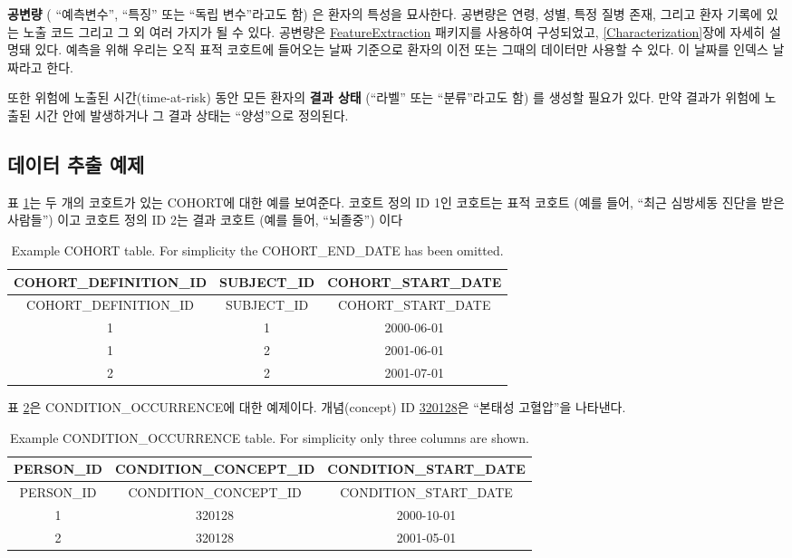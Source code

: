\documentclass[11pt]{book}
\theoremstyle{definition}
\theoremstyle{definition}
\theoremstyle{definition}
\theoremstyle{remark}
\begin{document}
\textbf{공변량} ( ``예측변수'', ``특징'' 또는 ``독립 변수''라고도 함) 은
환자의 특성을 묘사한다. 공변량은 연령, 성별, 특정 질병 존재, 그리고 환자
기록에 있는 노출 코드 그리고 그 외 여러 가지가 될 수 있다. 공변량은
\href{https://ohdsi.github.io/FeatureExtraction/}{FeatureExtraction}
패키지를 사용하여 구성되었고, \ref{Characterization}장에 자세히 설명돼
있다. 예측을 위해 우리는 오직 표적 코호트에 들어오는 날짜 기준으로
환자의 이전 또는 그때의 데이터만 사용할 수 있다. 이 날짜를 인덱스
날짜라고 한다.

또한 위험에 노출된 시간(time-at-risk) 동안 모든 환자의 \textbf{결과
상태} (``라벨'' 또는 ``분류''라고도 함) 를 생성할 필요가 있다. 만약
결과가 위험에 노출된 시간 안에 발생하거나 그 결과 상태는 ``양성''으로
정의된다.  

\subsection{데이터 추출 예제}\label{--}

표 \ref{tab:plpExampleCohorts}는 두 개의 코호트가 있는 COHORT에 대한
예를 보여준다. 코호트 정의 ID 1인 코호트는 표적 코호트 (예를 들어,
``최근 심방세동 진단을 받은 사람들'') 이고 코호트 정의 ID 2는 결과
코호트 (예를 들어, ``뇌졸중'') 이다

\begin{longtable}[]{@{}ccc@{}}
\caption{\label{tab:plpExampleCohorts} Example COHORT table. For simplicity
the COHORT\_END\_DATE has been omitted.}\tabularnewline
\toprule
COHORT\_DEFINITION\_ID & SUBJECT\_ID &
COHORT\_START\_DATE\tabularnewline
\midrule
\endfirsthead
\toprule
COHORT\_DEFINITION\_ID & SUBJECT\_ID &
COHORT\_START\_DATE\tabularnewline
\midrule
\endhead
1 & 1 & 2000-06-01\tabularnewline
1 & 2 & 2001-06-01\tabularnewline
2 & 2 & 2001-07-01\tabularnewline
\bottomrule
\end{longtable}

표 \ref{tab:plpExampleConditions}은 CONDITION\_OCCURRENCE에 대한
예제이다. 개념(concept) ID
\href{http://athena.ohdsi.org/search-terms/terms/320128}{320128}은
``본태성 고혈압''을 나타낸다.

\begin{longtable}[]{@{}ccc@{}}
\caption{\label{tab:plpExampleConditions} Example CONDITION\_OCCURRENCE
table. For simplicity only three columns are shown.}\tabularnewline
\toprule
PERSON\_ID & CONDITION\_CONCEPT\_ID &
CONDITION\_START\_DATE\tabularnewline
\midrule
\endfirsthead
\toprule
PERSON\_ID & CONDITION\_CONCEPT\_ID &
CONDITION\_START\_DATE\tabularnewline
\midrule
\endhead
1 & 320128 & 2000-10-01\tabularnewline
2 & 320128 & 2001-05-01\tabularnewline
\bottomrule
\end{longtable}
\end{document}
